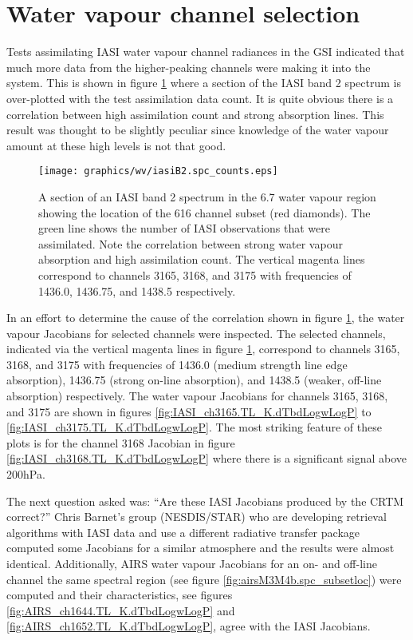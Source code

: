 \section{Water vapour channel selection}
Tests assimilating IASI water vapour channel radiances in the GSI indicated that much more data from the higher-peaking channels were making it into the system. This is shown in figure \ref{fig:iasiB2.spc_counts} where a section of the IASI band 2 spectrum is over-plotted with the test assimilation data count. It is quite obvious there is a correlation between high assimilation count and strong absorption lines. This result was thought to be slightly peculiar since knowledge of the water vapour amount at these high levels is not that good.
\begin{figure}[htp]
  \centering
  \texttt{[image: graphics/wv/iasiB2.spc\_counts.eps]}
  \caption{A section of an IASI band 2 spectrum in the 6.7\micron{} water vapour region showing the location of the 616 channel subset (red diamonds). The green line shows the number of IASI observations that were assimilated. Note the correlation between strong water vapour absorption and high assimilation count. The vertical magenta lines correspond to channels 3165, 3168, and 3175 with frequencies of 1436.0, 1436.75, and 1438.5\invcm{} respectively.}
  \label{fig:iasiB2.spc_counts}
\end{figure}

In an effort to determine the cause of the correlation shown in figure \ref{fig:iasiB2.spc_counts}, the water vapour Jacobians for selected channels were inspected. The selected channels, indicated via the vertical magenta lines in figure \ref{fig:iasiB2.spc_counts}, correspond to channels 3165, 3168, and 3175 with frequencies of 1436.0 (medium strength line edge absorption), 1436.75 (strong on-line absorption), and 1438.5\invcm{} (weaker, off-line absorption) respectively. The water vapour Jacobians for channels 3165, 3168, and 3175 are shown in figures \ref{fig:IASI_ch3165.TL_K.dTbdLogwLogP} to \ref{fig:IASI_ch3175.TL_K.dTbdLogwLogP}. The most striking feature of these plots is for the channel 3168 Jacobian in figure \ref{fig:IASI_ch3168.TL_K.dTbdLogwLogP} where there is a significant signal above 200hPa.

The next question asked was: ``Are these IASI Jacobians produced by the CRTM correct?'' Chris Barnet's group (NESDIS/STAR) who are developing retrieval algorithms with IASI data and use a different radiative transfer package computed some Jacobians for a similar atmosphere and the results were almost identical. Additionally, AIRS water vapour Jacobians for an on- and off-line channel the same spectral region (see figure \ref{fig:airsM3M4b.spc_subsetloc}) were computed and their characteristics, see figures \ref{fig:AIRS_ch1644.TL_K.dTbdLogwLogP} and \ref{fig:AIRS_ch1652.TL_K.dTbdLogwLogP}, agree with the IASI Jacobians.

